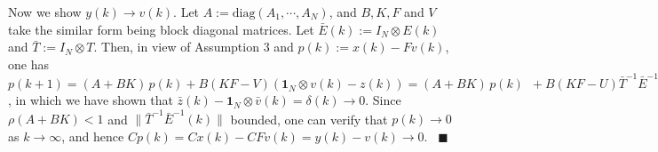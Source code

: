 \documentclass{autart}
\def\qedp{\hspace*{\fill}~{\tiny $\blacksquare$}}
\def\qedp{\hspace*{\fill}~{\tiny $\blacksquare$}}
\begin{document}






Now we show $y(k)\to v(k)$. Let $A:=\text{diag}(A_1, \cdots, A_N)$, and $B, K, F$ and $V$ take the similar form being block diagonal matrices. Let $\bar E(k):=I_N \otimes E(k)$ and $\bar T:=I_N \otimes T$. Then, in view of Assumption 3 and $p(k):= x(k) - F v(k) $, one has  
$
p(k+1)  
 = (A+BK)\, p(k) + B(KF-V)(\mathbf 1_N  \otimes v(k) -   z(k) ) 
= (A+BK)\, p(k)  
\,\,\,+ B(KF-U) \bar  T^{-1} \bar E ^ {-1}(k)(\mathbf 1_N  \otimes \bar v(k) - \bar z(k))
$, 
in which we have shown that $ \bar z(k)  - \mathbf 1_N \otimes \bar v(k)    = \delta(k) \to 0$. Since $\rho(A+BK)<1$ and  $\|\bar T^{-1}  \bar E ^ {-1}(k)\|$ bounded, one can verify that $p(k) \to 0$ as $k \to \infty$, and hence $Cp(k)=Cx(k) - CF v(k) = y(k) - v(k) \to 0$. \qedp
\end{document}
